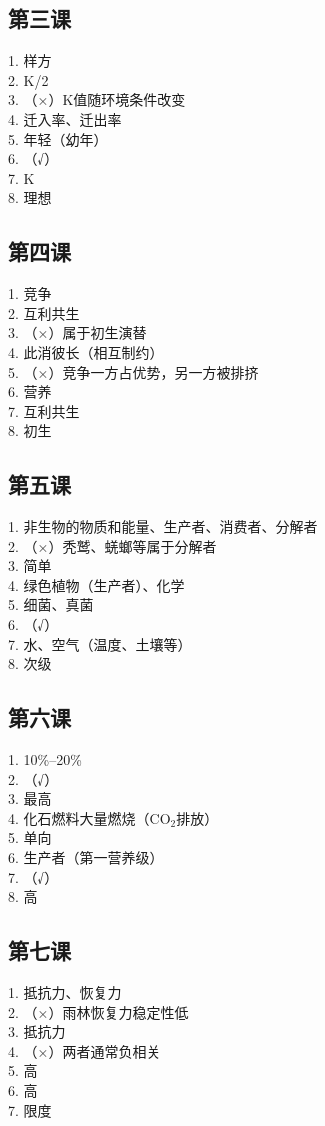 \documentclass[a4paper,12pt]{ctexart}
\begin{document}
\subsection*{第三课}
1. 样方\\
2. K/2\\
3. （×）K值随环境条件改变\\
4. 迁入率、迁出率\\
5. 年轻（幼年）\\
6. （√）\\
7. K\\
8. 理想

\subsection*{第四课}
1. 竞争\\
2. 互利共生\\
3. （×）属于初生演替\\
4. 此消彼长（相互制约）\\
5. （×）竞争一方占优势，另一方被排挤\\
6. 营养\\
7. 互利共生\\
8. 初生

\subsection*{第五课}
1. 非生物的物质和能量、生产者、消费者、分解者\\
2. （×）秃鹫、蜣螂等属于分解者\\
3. 简单\\
4. 绿色植物（生产者）、化学\\
5. 细菌、真菌\\
6. （√）\\
7. 水、空气（温度、土壤等）\\
8. 次级

\subsection*{第六课}
1. 10\%--20\%\\
2. （√）\\
3. 最高\\
4. 化石燃料大量燃烧（CO$_2$排放）\\
5. 单向\\
6. 生产者（第一营养级）\\
7. （√）\\
8. 高

\subsection*{第七课}
1. 抵抗力、恢复力\\
2. （×）雨林恢复力稳定性低\\
3. 抵抗力\\
4. （×）两者通常负相关\\
5. 高\\
6. 高\\
7. 限度
\end{document}

